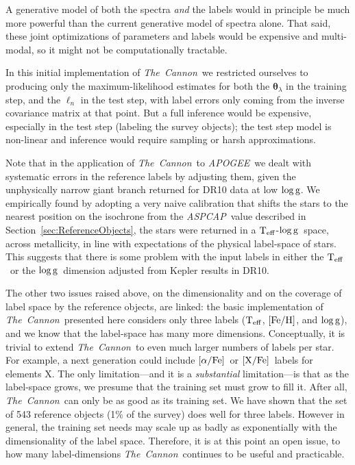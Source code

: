 \documentclass[12pt, preprint]{aastex}
\newcommand{\sectionname}{Section}
\newcommand{\tc}{\textsl{The~Cannon}}
\newcommand{\apogee}{\textsl{APOGEE}}
\newcommand{\aspcap}{\textsl{ASPCAP}}
\newcommand{\set}[1]{\bm{#1}}
\newcommand{\starlabel}{\ell}
\newcommand{\starlabelvec}{\set{\starlabel}}
\newcommand{\teff}{\mbox{$\rm T_{eff}$}}
\newcommand{\feh}{\mbox{$\rm [Fe/H]$}}
\newcommand{\xfe}{\mbox{$\rm [X/Fe]$}}
\newcommand{\alphafe}{\mbox{$\rm [\alpha/Fe]$}}
\newcommand{\logg}{\mbox{$\rm \log g$}}
\begin{document}
A generative model of both the spectra \emph{and} the labels
would in principle be much more powerful than the current generative
model of spectra alone.
That said, these joint optimizations of parameters and labels would be
expensive and multi-modal, so it might not be computationally
tractable.

In this initial implementation of \tc\ we restricted ourselves to producing only the maximum-likelihood estimates for both the $\set{\theta}_\lambda$ in the training step, and the $\starlabelvec_n$
in the test step, with label errors only coming from the inverse covariance matrix at that point.
But a full inference would be expensive, especially in the test step
(labeling the survey objects); the test step model is non-linear and
inference would require sampling or harsh approximations.

Note that in the application of \tc\ to \apogee\ we dealt with systematic errors in the reference
labels by adjusting them,  given the unphysically narrow giant branch returned for DR10 data at low \logg.  We empirically found by adopting a very naive calibration that shifts the stars to the nearest position on the isochrone from the \aspcap\ value described in \sectionname~\ref{sec:ReferenceObjects}, the stars were returned in a \teff-\logg\ space, across metallicity, in line with expectations of the physical label-space of stars. This suggests that there is some problem with the input labels in either the \teff\ or the \logg\ dimension adjusted from Kepler results in DR10. 

The other two issues raised above, on the dimensionality and on the coverage of label space by the reference objects, are linked: 
the basic implementation of \tc\ presented here considers only three
labels (\teff, \feh, and \logg), and we know that the label-space has many more dimensions.
Conceptually, it is trivial to extend \tc\ to even much larger numbers of labels per star. 
For example, a next generation could include \alphafe\ or \xfe\
labels for elements X.
The only limitation---and it is a \emph{substantial} limitation---is
that as the label-space grows, we presume that the training set must grow to fill it.
After all, \tc\ can only be as good as its training set.
We have shown that the set of 543 reference objects (1$\%$ of the survey) does well for three labels. However in general, the training set needs may scale up as badly as exponentially
with the dimensionality of the label space. Therefore, it is at this point an open issue, to 
how many label-dimensions \tc\ continues to be useful and practicable. 
\end{document}
